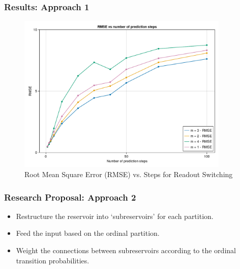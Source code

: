 \documentclass{beamer}
\begin{document}
\begin{frame}
    \frametitle{Results: Approach 1}

    \begin{figure}
        \centering
        \includegraphics[width=0.9\textwidth]{readout_switching_rmse_vs_steps.pdf}
        \caption{Root Mean Square Error (RMSE) vs. Steps for Readout Switching}
        \label{fig:readout_switching_rmse_vs_steps}
    \end{figure}
\end{frame}

\begin{frame}
    \frametitle{Research Proposal: Approach 2}
    \begin{itemize}
        \item Restructure the reservoir into `subreservoirs' for each partition.
        \item Feed the input based on the ordinal partition.
        \item Weight the connections between subreservoirs according to the ordinal transition probabilities.
    \end{itemize}
\end{frame}
\end{document}
